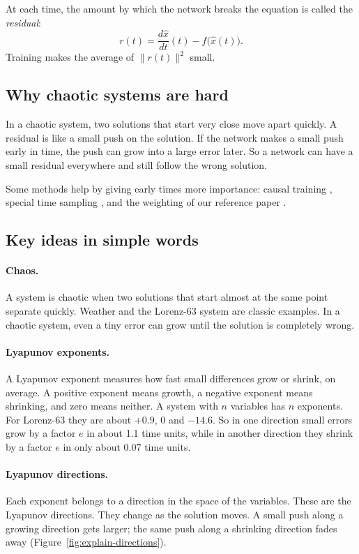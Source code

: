\documentclass[11pt,a4paper]{article}
\begin{document}
At each time, the amount by which the network breaks the equation is called the
\emph{residual}:
\[
 r(t) = \frac{d\hat x}{dt}(t) - f\big(\hat x(t)\big).
\]
Training makes the average of $\|r(t)\|^2$ small.

\subsection{Why chaotic systems are hard}
In a chaotic system, two solutions that start very close move apart quickly. A residual is
like a small push on the solution. If the network makes a small push early in time, the
push can grow into a large error later. So a network can have a small residual everywhere
and still follow the wrong solution.

Some methods help by giving early times more importance: causal training
\cite{wang2022}, special time sampling \cite{turinici2024sampling}, and the weighting of our
reference paper \cite{turinici2025}.

\subsection{Key ideas in simple words}
\paragraph{Chaos.} A system is chaotic when two solutions that start almost at the same
point separate quickly. Weather and the Lorenz-63 system are classic examples. In a chaotic
system, even a tiny error can grow until the solution is completely wrong.

\paragraph{Lyapunov exponents.} A Lyapunov exponent measures how fast small differences
grow or shrink, on average. A positive exponent means growth, a negative exponent means
shrinking, and zero means neither. A system with $n$ variables has $n$ exponents. For
Lorenz-63 they are about $+0.9$, $0$ and $-14.6$. So in one direction small errors grow
by a factor $e$ in about 1.1 time units, while in another direction they shrink by a
factor $e$ in only about $0.07$ time units.

\paragraph{Lyapunov directions.} Each exponent belongs to a direction in the space of the
variables. These are the Lyapunov directions. They change as the solution moves. A small
push along a growing direction gets larger; the same push along a shrinking direction
fades away (Figure~\ref{fig:explain-directions}).
\end{document}
